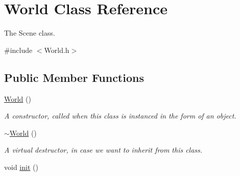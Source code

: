 \hypertarget{classWorld}{\section{World Class Reference}
\label{classWorld}
}


The Scene class.  




{\ttfamily \#include $<$World.\-h$>$}

\subsection*{Public Member Functions}
\begin{DoxyCompactItemize}
\item 
\hypertarget{classWorld_afa39d4e6f714a7a3691ac0c656f5e8a8}{\hyperlink{classWorld_afa39d4e6f714a7a3691ac0c656f5e8a8}{World} ()}\label{classWorld_afa39d4e6f714a7a3691ac0c656f5e8a8}

\begin{DoxyCompactList}\small\item\em A constructor, called when this class is instanced in the form of an object. \end{DoxyCompactList}\item 
\hypertarget{classWorld_a8c73fba541a5817fff65147ba47cd827}{\hyperlink{classWorld_a8c73fba541a5817fff65147ba47cd827}{$\sim$\-World} ()}\label{classWorld_a8c73fba541a5817fff65147ba47cd827}

\begin{DoxyCompactList}\small\item\em A virtual destructor, in case we want to inherit from this class. \end{DoxyCompactList}\item 
\hypertarget{classWorld_a0150607a49c2400d5c848159dd02d533}{void \hyperlink{classWorld_a0150607a49c2400d5c848159dd02d533}{init} ()}\label{classWorld_a0150607a49c2400d5c848159dd02d533}


\end{DoxyCompactItemize}
